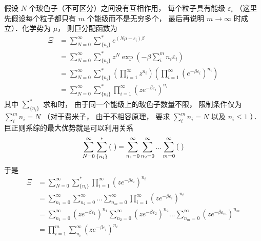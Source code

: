 假设 $N$ 个玻色子（不可区分）之间没有互相作用， 每个粒子具有能级 ${\varepsilon _i}$ （这里先假设每个粒子都只有 $m$ 个能级而不是无穷多个， 最后再说明 $m \to \infty $ 时成立）．化学势为 $\mu $，  则巨分配函数为
\begin{equation}
  \begin{aligned}
\Xi & = \sum\limits_{N = 0}^\infty  {\sum\limits_{\{ {n_i}\} }^ *  {{e^{(N\mu  - {\varepsilon _i})\beta }}} }  \\
& = \sum\limits_{N = 0}^\infty  {\sum\limits_{\{ {n_i}\} }^ *  {{z^N}\exp \left( { - \beta \sum\limits_i^m {{n_i}{\varepsilon _i}} } \right)} }  \\
& = \sum\limits_{N = 0}^\infty  {\sum\limits_{\{ {n_i}\} }^ *  {\left( {\prod\limits_{i = 1}^\infty  {{z^{{n_i}}}} } \right)\left( {\prod\limits_{i = 1}^\infty  {{{({e^{ - \beta {\varepsilon _i}}})}^{{n_i}}}} } \right)} } \\
& = \sum\limits_{N = 0}^\infty  {\sum\limits_{\{ {n_i}\} }^ *  {\prod\limits_{i = 1}^\infty  {{{(z{e^{ - \beta {\varepsilon _i}}})}^{{n_i}}}} } }
\end{aligned}
\end{equation}
其中 $\sum\limits_{\{ {n_i}\} }^ *  {} $ 求和时， 由于同一个能级上的玻色子数量不限， 限制条件仅为 $\sum\limits_i^m {{n_i}}  = N$ （对于费米子， 由于不相容原理， 要求 $\sum\limits_i^m {{n_i}}  = N$ 以及 ${n_i} \le 1$ ）．\\
巨正则系综的最大优势就是可以利用关系
\begin{equation}
  \sum\limits_{N = 0}^\infty  {\sum\limits_{\{ {n_i}\} }^ *  {({\kern 1pt} {\kern 1pt} {\kern 1pt} )} }  = \sum\limits_{{n_1} = 0}^\infty  {\sum\limits_{{n_2} = 0}^\infty  {...\sum\limits_{m = 0}^\infty  {({\kern 1pt} {\kern 1pt} {\kern 1pt} )} } } 
\end{equation}
于是
\begin{equation}
  \begin{aligned}
\Xi & = \sum\limits_{N = 0}^\infty  {\sum\limits_{\{ {n_i}\} }^ *  {\prod\limits_{i = 1}^\infty  {{{(z{e^{ - \beta {\varepsilon _i}}})}^{{n_i}}}} } }  \\
& = \sum\limits_{{n_1} = 0}^\infty  {\sum\limits_{{n_2} = 0}^\infty  {...\sum\limits_{{n_m} = 0}^\infty  {\prod\limits_{i = 1}^\infty  {{{(z{e^{ - \beta {\varepsilon _i}}})}^{{n_i}}}} } } }  \\
& = \sum\limits_{{n_1} = 0}^\infty  {{{(z{e^{ - \beta {\varepsilon _1}}})}^{{n_1}}}\sum\limits_{{n_2} = 0}^\infty  {{{(z{e^{ - \beta {\varepsilon _2}}})}^{{n_2}}}...\sum\limits_{{n_m} = 0}^\infty  {{{(z{e^{ - \beta {\varepsilon _m}}})}^{{n_m}}}} } } \\
& = \prod\limits_{i = 1}^m {\sum\limits_{{n_i}}^\infty  {{{(z{e^{ - \beta {\varepsilon _i}}})}^{{n_i}}}} }
\end{aligned}
\end{equation}
